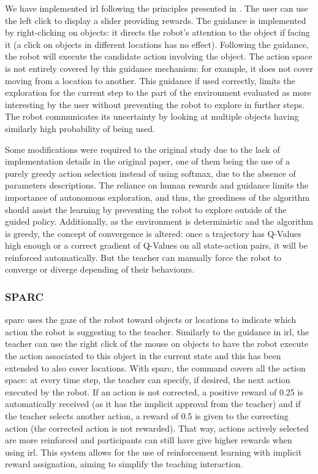 We have implemented \gls{irl} following the principles presented in \cite{thomaz2008teachable}. The user can use the left click to display a slider providing rewards. The guidance is implemented by right-clicking on objects: it directs the robot's attention to the object if facing it (a click on objects in different locations has no effect). Following the guidance, the robot will execute the candidate action involving the object. The action space is not entirely covered by this guidance mechanism: for example, it does not cover moving from a location to another. This guidance if used correctly, limits the exploration for the current step to the part of the environment evaluated as more interesting by the user without preventing the robot to explore in further steps. The robot communicates its uncertainty by looking at multiple objects having similarly high probability of being used. 

Some modifications were required to the original study due to the lack of implementation details in the original paper, one of them being the use of a purely greedy action selection instead of using softmax, due to the absence of parameters descriptions. The reliance on human rewards and guidance limits the importance of autonomous exploration, and thus, the greediness of the algorithm should assist the learning by preventing the robot to explore outside of the guided policy. Additionally, as the environment is deterministic and the algorithm is greedy, the concept of convergence is altered: once a trajectory has Q-Values high enough or a correct gradient of Q-Values on all state-action pairs, it will be reinforced automatically. But the teacher can manually force the robot to converge or diverge depending of their behaviours.

\subsubsection{SPARC}

\gls{sparc} uses the gaze of the robot toward objects or locations to indicate which action the robot is suggesting to the teacher. Similarly to the guidance in \gls{irl}, the teacher can use the right click of the mouse on objects to have the robot execute the action associated to this object in the current state and this has been extended to also cover locations. With \gls{sparc}, the command covers all the action space: at every time step, the teacher can specify, if desired, the next action executed by the robot. If an action is not corrected, a positive reward of 0.25 is automatically received (as it has the implicit approval from the teacher) and if the teacher selects another action, a reward of 0.5 is given to the correcting action (the corrected action is not rewarded). That way, actions actively selected are more reinforced and participants can still have give higher rewards when using \gls{irl}. This system allows for the use of reinforcement learning with implicit reward assignation, aiming to simplify the teaching interaction.


